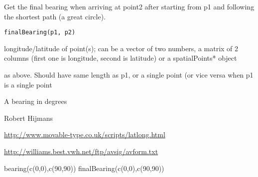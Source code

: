 \begin{Description}\relax
Get the final bearing when arriving at point2 after starting from p1 and following the shortest path (a great circle).
\end{Description}
\begin{Usage}
\begin{verbatim}
finalBearing(p1, p2)
\end{verbatim}
\end{Usage}
\begin{Arguments}
\begin{ldescription}
\item[\code{p1}] longitude/latitude of point(s); can be a vector of two numbers, a matrix of 2 columns (first one is longitude, second is latitude) or a spatialPoints* object
\item[\code{p2}] as above. Should have same length as p1, or a single point (or vice versa when p1 is a single point
\end{ldescription}
\end{Arguments}
\begin{Value}
A bearing in degrees
\end{Value}
\begin{Author}\relax
Robert Hijmans
\end{Author}
\begin{References}\relax
\url{http://www.movable-type.co.uk/scripts/latlong.html}

\url{http://williams.best.vwh.net/ftp/avsig/avform.txt}
\end{References}
\begin{SeeAlso}\relax
{}
\end{SeeAlso}
\begin{Examples}
\begin{ExampleCode}
bearing(c(0,0),c(90,90))
finalBearing(c(0,0),c(90,90))
\end{ExampleCode}
\end{Examples}

